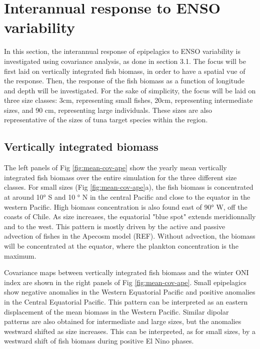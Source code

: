 \section{Interannual response to ENSO variability}

In this section, the interannual response of epipelagics to ENSO variability is investigated using covariance analysis, as done in section 3.1. The focus will be first laid on vertically integrated fish biomass, in order to have a spatial vue of the response. Then, the response of the fish biomass as a function of longitude and depth will be investigated.
For the sake of simplicity, the focus will be laid on three size classes: 3cm, representing small fishes, 20cm, representing intermediate sizes, and 90 cm, representing large individuals. These sizes are also representative of the sizes of tuna target species within the region.

\subsection{Vertically integrated biomass}

The left panels of Fig \ref{fig:mean-cov-ape} show the yearly mean vertically integrated fish biomass over the entire simulation for the three different size classes. For small sizes (Fig \ref{fig:mean-cov-ape}a), the fish biomass is concentrated at around 10° S and 10 ° N in the central Pacific and close to the equator in the western Pacific. High biomass concentration is also found east of 90° W, off the coasts of Chile. As size increases, the equatorial "blue spot" extends meridionnally and to the west. This pattern is mostly driven by the active and passive advection of fishes in the Apecosm model (REF). Without advection, the biomass will be concentrated at the equator, where the plankton concentration is the maximum.

Covariance maps between vertically integrated fish biomass and the winter ONI index are shown in the right panels of  Fig \ref{fig:mean-cov-ape}.
Small epipelagics show negative anomalies in the Western Equatorial Pacific and positive anomalies in the Central Equatorial Pacific. This pattern can be interpreted as an eastern displacement of the mean biomass in the Western Pacific.
Similar dipolar patterns are also obtained for intermediate and large sizes, but the anomalies westward shifted as size increases. This can be interpreted, as for small sizes, by a westward shift of fish biomass during positive El Nino phases.


